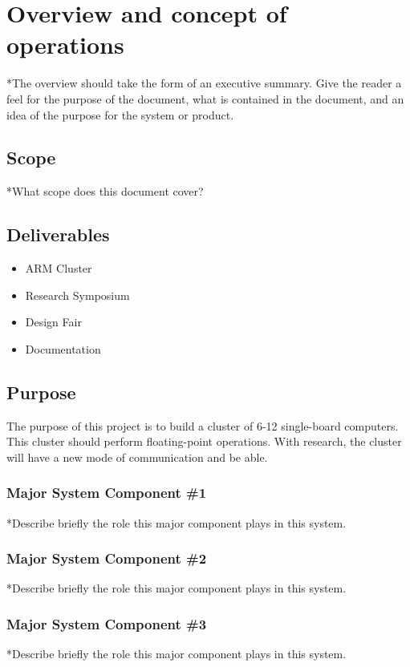 
\chapter{Overview and concept of operations}

*The overview should take the form of an executive summary.  Give the reader a feel 
for the purpose of the document, what is contained in the document, and an idea 
of the purpose for the system or product. 


\section{Scope}
*What scope does this document cover? 

\section{Deliverables}
\begin{itemize}
	\item ARM Cluster
	\item Research Symposium
	\item Design Fair
	\item Documentation
\end{itemize}

\section{Purpose}
The purpose of this project is to build a cluster of 6-12 single-board computers. This cluster should perform floating-point operations. With research, the cluster will have a new mode of communication and be able.

\subsection{Major System Component \#1}
*Describe briefly the role this major component plays in this system. 

\subsection{Major System Component \#2}
*Describe briefly the role this major component plays in this system. 

\subsection{Major System Component \#3}
*Describe briefly the role this major component plays in this system. 

